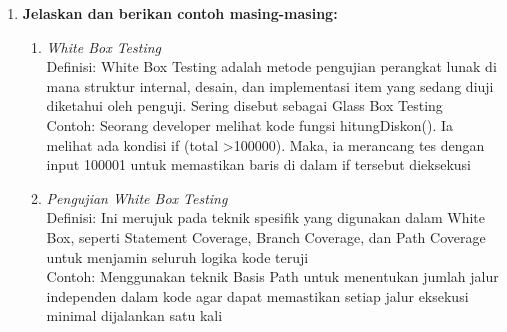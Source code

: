 
\clearpage               %


\begin{enumerate}[leftmargin=*, label=\textbf{\arabic*.}]

      \item \textbf{Jelaskan dan berikan contoh masing-masing:}
            \begin{enumerate}[label=\textit{\alph*)}, leftmargin=0.5cm]
                  \item \textit{White Box Testing} \\
                        Definisi: White Box Testing adalah metode pengujian perangkat lunak di mana struktur internal, desain, dan implementasi item yang sedang diuji diketahui oleh penguji. Sering disebut sebagai Glass Box Testing\\
                        Contoh: Seorang developer melihat kode fungsi hitungDiskon(). Ia melihat ada kondisi if (total \textgreater 100000). Maka, ia merancang tes dengan input 100001 untuk memastikan baris di dalam if tersebut dieksekusi\\

                  \item \textit{Pengujian White Box Testing} \\
                        Definisi: Ini merujuk pada teknik spesifik yang digunakan dalam White Box, seperti Statement Coverage, Branch Coverage, dan Path Coverage untuk menjamin seluruh logika kode teruji\\
                        Contoh: Menggunakan teknik Basis Path untuk menentukan jumlah jalur independen dalam kode agar dapat memastikan setiap jalur eksekusi minimal dijalankan satu kali
            \end{enumerate}
            \vspace{0.5cm} %


\end{enumerate}
